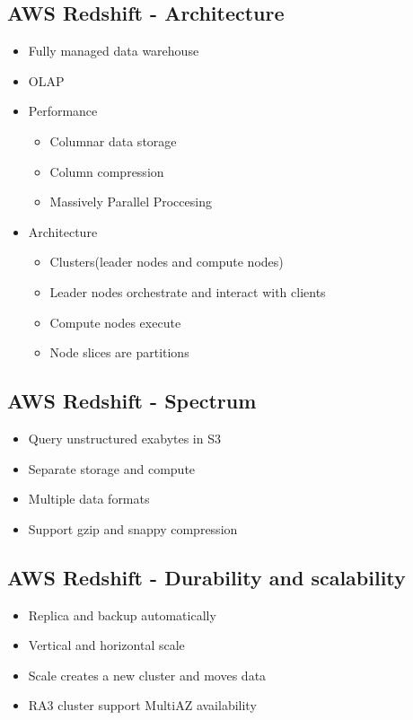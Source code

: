 \documentclass[../main.tex]{subfiles}
\begin{document}
\subsection{AWS Redshift - Architecture}
\begin{itemize}
    \item Fully managed data warehouse
    \item OLAP
    \item Performance
    \begin{itemize}
        \item Columnar data storage
        \item Column compression
        \item Massively Parallel Proccesing
    \end{itemize}
    \item Architecture
    \begin{itemize}
        \item Clusters(leader nodes and compute nodes)
        \item Leader nodes orchestrate and interact with clients
        \item Compute nodes execute
        \item Node slices are partitions
    \end{itemize}
\end{itemize}

\subsection{AWS Redshift - Spectrum}
\begin{itemize}
    \item Query unstructured exabytes in S3
    \item Separate storage and compute
    \item Multiple data formats
    \item Support gzip and snappy compression
\end{itemize}

\subsection{AWS Redshift - Durability and scalability}
\begin{itemize}
    \item Replica and backup automatically
    \item Vertical and horizontal scale
    \item Scale creates a new cluster and moves data
    \item RA3 cluster support MultiAZ availability
\end{itemize}
\end{document}
